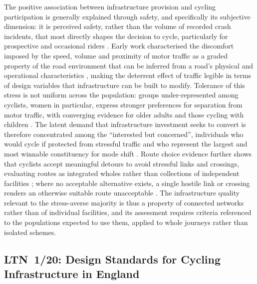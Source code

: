 \documentclass[final,5p,times,twocolumn,authoryear]{elsarticle}
\begin{document}
The positive association between infrastructure provision and cycling participation is generally explained through safety, and specifically its subjective dimension: it is perceived safety, rather than the volume of recorded crash incidents, that most directly shapes the decision to cycle, particularly for prospective and occasional riders \citep{chaurand2013, sanders2015, manton2016}. Early work characterised the discomfort imposed by the speed, volume and proximity of motor traffic as a graded property of the road environment that can be inferred from a road's physical and operational characteristics \citep{sorton1994, landis1997, harkey1998}, making the deterrent effect of traffic legible in terms of design variables that infrastructure can be built to modify. Tolerance of this stress is not uniform across the population: groups under-represented among cyclists, women in particular, express stronger preferences for separation from motor traffic, with converging evidence for older adults and those cycling with children \citep{aldred2017}. The latent demand that infrastructure investment seeks to convert is therefore concentrated among the ``interested but concerned'', individuals who would cycle if protected from stressful traffic and who represent the largest and most winnable constituency for mode shift \citep{geller2009, dill2013}. Route choice evidence further shows that cyclists accept meaningful detours to avoid stressful links and crossings, evaluating routes as integrated wholes rather than collections of independent facilities \citep{broach2012, park2019, berghoefer2023}; where no acceptable alternative exists, a single hostile link or crossing renders an otherwise suitable route unacceptable \citep{mekuria2012a, furth2018}. The infrastructure quality relevant to the stress-averse majority is thus a property of connected networks rather than of individual facilities, and its assessment requires criteria referenced to the populations expected to use them, applied to whole journeys rather than isolated schemes.

\subsection{LTN~1/20: Design Standards for Cycling Infrastructure in England}
\label{sec:ltn120-limits}
\end{document}
